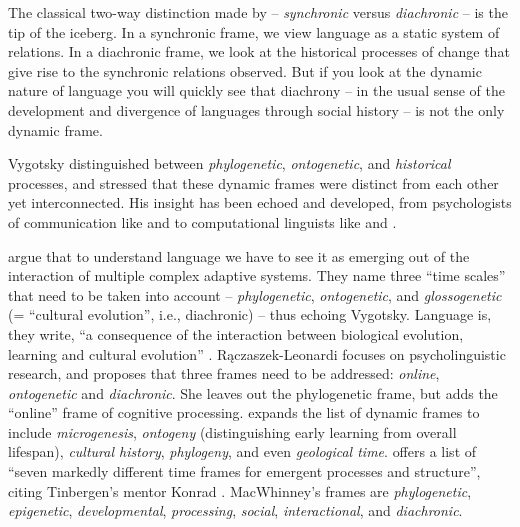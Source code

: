The classical two-way distinction made by \citet{saussure_cours_1916} -- \textit{synchronic} versus \textit{diachronic} -- is the tip of the iceberg. In a synchronic frame, we view language as a static 
system of relations. In a diachronic frame, we look at the historical processes of change that give rise to the synchronic relations observed. But if you look at the dynamic nature of language you will quickly see that 
diachrony -- in the usual sense of the development and 
divergence of languages through social history -- is not the only dynamic frame. 



Vygotsky distinguished between \textit{phylogenetic}, \textit{ontogenetic}, and \textit{historical} processes, and stressed that 
these dynamic frames were distinct from each other yet interconnected. 
His insight has been echoed and developed, from 
psychologists of communication like \citet{tomasello_cultural_1999} and \citet{cole_phylogeny_2007} to computational linguists like \citet{steels_synthesizing_1998,steels_evolving_2003} and \citet{smith_complex_2003}. 



\citet[540]{smith_complex_2003} argue that to understand language we have to see it 
as emerging out of the interaction of multiple complex adaptive systems. They name three ``time scales'' that need to be taken into account -- \textit{phylogenetic}, \textit{ontogenetic}, and \textit{glossogenetic} 
(= ``cultural evolution'', i.e., diachronic) -- thus echoing 
Vygotsky. Language is, they write, ``a consequence of the interaction 
between biological evolution, learning and cultural evolution'' \citep[541]{smith_complex_2003}. R\k{a}czaszek-Leonardi focuses on psycholinguistic research, and proposes that three frames need to be addressed: \textit{online}, \textit{ontogenetic} and \textit{diachronic}. She leaves out the phylogenetic frame, but adds the ``online'' frame 
of cognitive processing. \citet[185]{cole_cultural_1996} expands the list of dynamic frames to include \textit{microgenesis}, \textit{ontogeny} (distinguishing early learning from 
overall lifespan), \textit{cultural history}, \textit{phylogeny}, 
and even \textit{geological time}. \citet[193--195]{macwhinney_emergence_2005} offers a list of ``seven markedly different 
time frames for emergent processes and structure'', citing Tinbergen's 
mentor Konrad \citet{lorenz_evolution_1958}. MacWhinney's frames are \textit{phylogenetic}, \textit{epigenetic}, \textit{developmental}, 
\textit{processing}, \textit{social}, \textit{interactional}, 
and \textit{diachronic}. 



